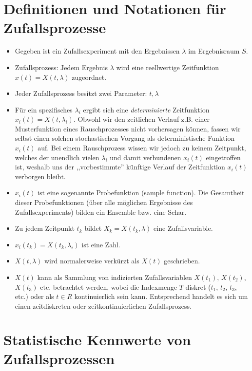 \documentclass[10pt, a4paper]{article}
\begin{document}
\section{Definitionen und Notationen f\"ur Zufallsprozesse}
\begin{itemize}
  \item Gegeben ist ein Zufallsexperiment mit den Ergebnissen $\lambda$ im Ergebnisraum $S$.
  \item Zufallsprozess: Jedem Ergebnis $\lambda$ wird eine reellwertige Zeitfunktion
        $x(t) = X(t,\lambda)$ zugeordnet.
  \item Jeder Zufallsprozess besitzt zwei Parameter: $t,\lambda$
  \item F\"ur ein spezifisches $\lambda_{i}$ ergibt sich eine \textit{determinierte} Zeitfunktion 
        $x_{i}(t) = X(t,\lambda_{i})$. 
        Obwohl wir den zeitlichen Verlauf z.B. einer Musterfunktion eines 
        Rauschprozesses nicht vorhersagen k\"onnen,
        fassen wir selbst einen solchen stochastischen Vorgang als deterministische
        Funktion $x_{i}(t)$ auf. Bei einem Rauschprozess wissen wir jedoch zu keinem Zeitpunkt,
        welches der unendlich vielen $\lambda_{i}$ und damit verbundenen $x_{i}(t)$ eingetroffen ist,
        weshalb uns der ,,vorbestimmte'' k\"unftige Verlauf der Zeitfunktion $x_{i}(t)$ verborgen
        bleibt.
  \item $x_{i}(t)$ ist eine sogenannte Probefunktion (sample function). Die Gesamtheit
        dieser Probefunktionen (\"uber alle m\"oglichen Ergebnisse des Zufallsexperiments) 
        bilden ein Ensemble bzw. eine Schar. 
  \item Zu jedem Zeitpunkt $t_{k}$ bildet $X_{k} = X(t_{k}, \lambda )$
        eine Zufallsvariable. 
  \item $x_{i}(t_{k}) = X(t_{k}, \lambda_{i})$ ist eine Zahl. 
  \item $X(t,\lambda)$ wird normalerweise verk\"urzt als 
        $X(t)$ geschrieben.
  \item $X(t)$ kann als Sammlung von indizierten Zufallsvariablen 
        $X(t_{1})$, $X(t_{2})$, $X(t_{3})$ etc. betrachtet
        werden, wobei die Indexmenge $T$ diskret ($t_{1}$, $t_{2}$, $t_{3}$, etc.)
        oder als $t \in R$ kontinuierlich sein kann. 
        Entsprechend handelt es sich um einen zeitdiskreten oder zeitkontinuierlichen Zufallsprozess.
\end{itemize} 

\section{Statistische Kennwerte von Zufallsprozessen}
\end{document}
